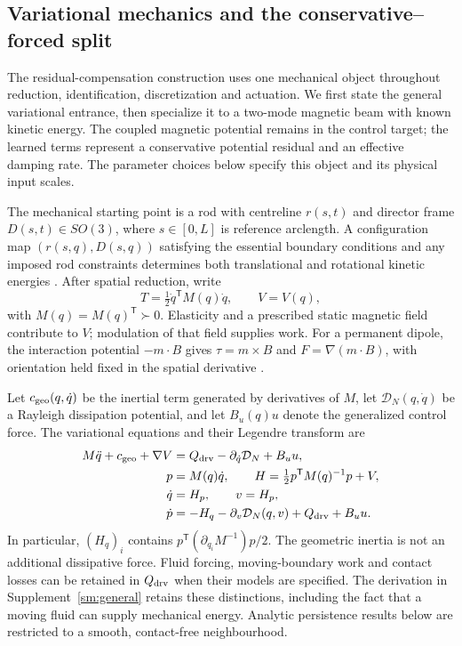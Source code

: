 \subsection{Variational mechanics and the conservative--forced split}
\label{mech:variational}
The residual-compensation construction uses one mechanical object
throughout reduction, identification, discretization and actuation.
We first state the general variational entrance, then specialize it to
a two-mode magnetic beam with known kinetic energy. The coupled
magnetic potential remains in the control target; the learned terms
represent a conservative potential residual and an effective damping
rate. The parameter choices below specify this object and its physical
input scales.

The mechanical starting point is a rod with centreline $r(s,t)$ and
director frame $D(s,t)\in SO(3)$, where $s\in[0,L]$ is reference
arclength. A configuration map $(r(s,q),D(s,q))$ satisfying the essential
boundary conditions and any imposed rod constraints determines both
translational and rotational kinetic energies \citep{simo,antman}.
After spatial reduction, write
\begin{equation}
 T=\tfrac12\dot q^{\mathsf T}M(q)\dot q,\qquad V=V(q),
 \label{mech:general-energy}
\end{equation}
with $M(q)=M(q)^{\mathsf T}\succ0$. Elasticity and a prescribed static
magnetic field contribute to $V$; modulation of that field supplies work.
For a permanent dipole, the interaction potential $-m\cdot B$ gives
$\tau=m\times B$ and $F=\nabla(m\cdot B)$, with orientation held fixed
in the spatial derivative \citep{abbott}.

Let $c_{\rm geo}(q,\dot q)$ be the inertial term generated by derivatives
of $M$, let $\mathcal D_N(q,\dot q)$ be a Rayleigh dissipation potential,
and let $B_u(q)u$ denote the generalized control force. The variational
equations and their Legendre transform are
\begin{align}
 M\ddot q+c_{\rm geo}+\nabla V
 &=Q_{\rm drv}-\partial_{\dot q}\mathcal D_N+B_u u,
 \label{mech:general-lagrange}\\
 p&=M(q)\dot q,\qquad
 H=\tfrac12p^{\mathsf T}M(q)^{-1}p+V,\nonumber\\
 \dot q&=H_p,\qquad v=H_p,\nonumber\\
 \dot p&=-H_q-\partial_v\mathcal D_N(q,v)+Q_{\rm drv}+B_u u.
 \label{mech:general-hamiltonian}
\end{align}
In particular, $(H_q)_i$ contains
$p^{\mathsf T}(\partial_{q_i}M^{-1})p/2$.
The geometric inertia is not an additional dissipative force.
Fluid forcing, moving-boundary work and contact losses can be retained
in $Q_{\rm drv}$ when their models are specified. The derivation in
Supplement~\ref{sm:general} retains these distinctions, including the
fact that a moving fluid can supply mechanical energy. Analytic
persistence results below are restricted to a smooth, contact-free
neighbourhood.

